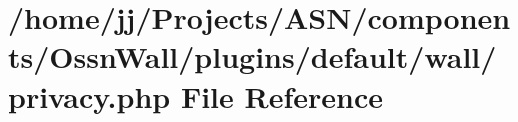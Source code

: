 \hypertarget{components_2_ossn_wall_2plugins_2default_2wall_2privacy_8php}{}\section{/home/jj/\+Projects/\+A\+S\+N/components/\+Ossn\+Wall/plugins/default/wall/privacy.php File Reference}
\label{components_2_ossn_wall_2plugins_2default_2wall_2privacy_8php}
